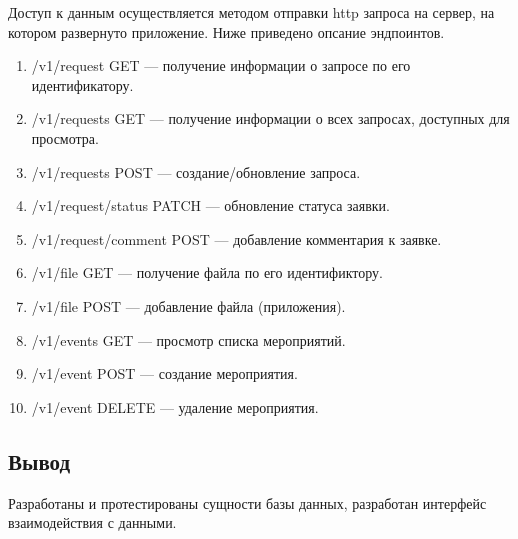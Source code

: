 Доступ к данным осуществляется методом отправки http запроса на сервер, на котором развернуто приложение. Ниже приведено опсание эндпоинтов.

\begin{enumerate}
	\item /v1/request GET --- получение информации о запросе по его идентификатору. 
	\item /v1/requests GET --- получение информации о всех запросах, доступных для просмотра.
	\item /v1/requests POST --- создание/обновление запроса.
	\item /v1/request/status PATCH --- обновление статуса заявки.
	\item /v1/request/comment POST --- добавление комментария к заявке.
	\item /v1/file GET --- получение файла по его идентификтору.
	\item /v1/file POST --- добавление файла (приложения).
	\item /v1/events GET --- просмотр списка мероприятий.
	\item /v1/event POST --- создание мероприятия.
	\item /v1/event DELETE --- удаление мероприятия.
\end{enumerate}

\subsection{Вывод}

Разработаны и протестированы сущности базы данных, разработан интерфейс взаимодействия с данными.

\pagebreak